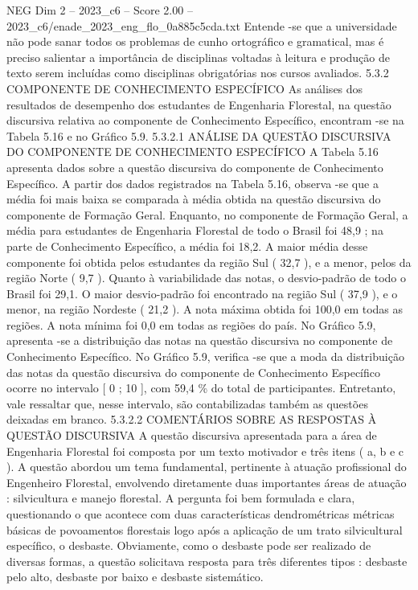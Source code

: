 \begin{textsample}{NEG Dim 2 – 2023\_c6 – Score 2.00 – 2023\_c6/enade\_2023\_eng\_flo\_0a885c5cda.txt}
Entende -se que a universidade não pode sanar todos os problemas de cunho ortográfico e gramatical, mas é preciso salientar a importância de disciplinas voltadas à leitura e produção de texto serem incluídas como disciplinas obrigatórias nos cursos avaliados. 5.3.2 COMPONENTE DE CONHECIMENTO ESPECÍFICO As análises dos resultados de desempenho dos estudantes de Engenharia Florestal, na questão discursiva relativa ao componente de Conhecimento Específico, encontram -se na Tabela 5.16 e no Gráfico 5.9. 5.3.2.1 ANÁLISE DA QUESTÃO DISCURSIVA DO COMPONENTE DE CONHECIMENTO ESPECÍFICO A Tabela 5.16 apresenta dados sobre a questão discursiva do componente de Conhecimento Específico.
A partir dos dados registrados na Tabela 5.16, observa -se que a média foi mais baixa se comparada à média obtida na questão discursiva do componente de Formação Geral.
Enquanto, no componente de Formação Geral, a média para estudantes de Engenharia Florestal de todo o Brasil foi 48,9 ; na parte de Conhecimento Específico, a média foi 18,2.
A maior média desse componente foi obtida pelos estudantes da região Sul ( 32,7 ), e a menor, pelos da região Norte ( 9,7 ).
Quanto à variabilidade das notas, o desvio-padrão de todo o Brasil foi 29,1.
O maior desvio-padrão foi encontrado na região Sul ( 37,9 ), e o menor, na região Nordeste ( 21,2 ).
A nota máxima obtida foi 100,0 em todas as regiões.
A nota mínima foi 0,0 em todas as regiões do país.
No Gráfico 5.9, apresenta -se a distribuição das notas na questão discursiva no componente de Conhecimento Específico.
No Gráfico 5.9, verifica -se que a moda da distribuição das notas da questão discursiva do componente de Conhecimento Específico ocorre no intervalo [ 0 ; 10 ], com 59,4 \% do total de participantes.
Entretanto, vale ressaltar que, nesse intervalo, são contabilizadas também as questões deixadas em branco. 5.3.2.2 COMENTÁRIOS SOBRE AS RESPOSTAS À QUESTÃO DISCURSIVA A questão discursiva apresentada para a área de Engenharia Florestal foi composta por um texto motivador e três itens ( a, b e c ).
A questão abordou um tema fundamental, pertinente à atuação profissional do Engenheiro Florestal, envolvendo diretamente duas importantes áreas de atuação : silvicultura e manejo florestal.
A pergunta foi bem formulada e clara, questionando o que acontece com duas características dendrométricas métricas básicas de povoamentos florestais logo após a aplicação de um trato silvicultural específico, o desbaste.
Obviamente, como o desbaste pode ser realizado de diversas formas, a questão solicitava resposta para três diferentes tipos : desbaste pelo alto, desbaste por baixo e desbaste sistemático.

\end{textsample}
